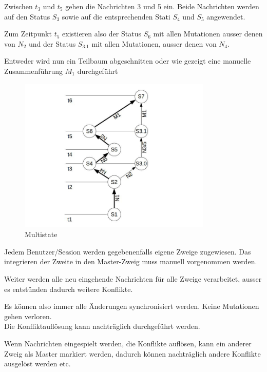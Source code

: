 \documentclass[oneside,11pt,parskip=half,ngerman]{scrreprt}
\makeatletter
\def\maxwidth{\ifdim\Gin@nat@width>\linewidth\linewidth
\else\Gin@nat@width\fi}
\let\Oldincludegraphics\includegraphics
\renewcommand{\includegraphics}[1]{\Oldincludegraphics[width=\maxwidth,height=20em,keepaspectratio]{#1}}
\makeatother
\begin{document}
Zwischen \(t_3\) und \(t_5\) gehen die Nachrichten 3 und 5 ein. Beide
Nachrichten werden auf den Status \(S_3\) sowie auf die entsprechenden
Stati \(S_4\) und \(S_5\) angewendet.

Zum Zeitpunkt \(t_5\) existieren also der Status \(S_6\) mit allen
Mutationen ausser denen von \(N_2\) und der Status \(S_{3.1}\) mit allen
Mutationen, ausser denen von \(N_4\).

Entweder wird nun ein Teilbaum abgeschnitten oder wie gezeigt eine
manuelle Zusammenführung \(M_1\) durchgeführt

\begin{figure}[htbp]
\centering
\includegraphics{img/mulstistate.jpg}
\caption{Multistate\label{fig:multistate}}
\end{figure}

Jedem Benutzer/Session werden gegebenenfalls eigene Zweige zugewiesen.
Das integrieren der Zweite in den Master-Zweig muss manuell vorgenommen
werden.

Weiter werden alle neu eingehende Nachrichten für alle Zweige
verarbeitet, ausser es entstünden dadurch weitere Konflikte.

Es können also immer alle Änderungen synchronisiert werden. Keine
Mutationen gehen verloren.\\Die Konfliktauflösung kann nachträglich
durchgeführt werden.

Wenn Nachrichten eingespielt werden, die Konflikte auflösen, kann ein
anderer Zweig als Master markiert werden, dadurch können nachträglich
andere Konflikte ausgelöst werden etc.
\end{document}
